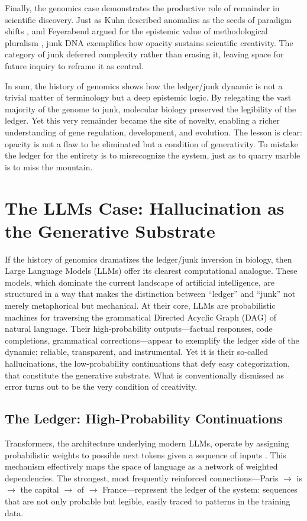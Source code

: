 \documentclass[12pt]{article}
\begin{document}
{{{Finally, the genomics case demonstrates the productive role of remainder in scientific discovery. Just as Kuhn described anomalies as the seeds of paradigm shifts \citep{kuhn1962}, and Feyerabend argued for the epistemic value of methodological pluralism \citep{feyerabend1975}, junk DNA exemplifies how opacity sustains scientific creativity. The category of junk deferred complexity rather than erasing it, leaving space for future inquiry to reframe it as central.

In sum, the history of genomics shows how the ledger/junk dynamic is not a trivial matter of terminology but a deep epistemic logic. By relegating the vast majority of the genome to junk, molecular biology preserved the legibility of the ledger. Yet this very remainder became the site of novelty, enabling a richer understanding of gene regulation, development, and evolution. The lesson is clear: opacity is not a flaw to be eliminated but a condition of generativity. To mistake the ledger for the entirety is to misrecognize the system, just as to quarry marble is to miss the mountain.

\section{The LLMs Case: Hallucination as the Generative Substrate}

If the history of genomics dramatizes the ledger/junk inversion in biology, then Large Language Models (LLMs) offer its clearest computational analogue. These models, which dominate the current landscape of artificial intelligence, are structured in a way that makes the distinction between ``ledger'' and ``junk'' not merely metaphorical but mechanical. At their core, LLMs are probabilistic machines for traversing the grammatical Directed Acyclic Graph (DAG) of natural language. Their high-probability outputs---factual responses, code completions, grammatical corrections---appear to exemplify the ledger side of the dynamic: reliable, transparent, and instrumental. Yet it is their so-called hallucinations, the low-probability continuations that defy easy categorization, that constitute the generative substrate. What is conventionally dismissed as error turns out to be the very condition of creativity.

\subsection{The Ledger: High-Probability Continuations}
Transformers, the architecture underlying modern LLMs, operate by assigning probabilistic weights to possible next tokens given a sequence of inputs \citep{vaswani2017}. This mechanism effectively maps the space of language as a network of weighted dependencies. The strongest, most frequently reinforced connections---Paris $\to$ is $\to$ the capital $\to$ of $\to$ France---represent the ledger of the system: sequences that are not only probable but legible, easily traced to patterns in the training data.

}}}
\end{document}
